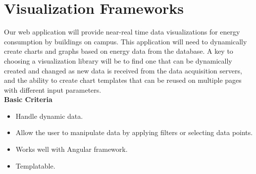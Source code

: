 \documentclass[onecolumn, draftclsnofoot,10pt, compsoc]{IEEEtran}
\begin{document}
\section{Visualization Frameworks}
Our web application will provide near-real time data visualizations for energy consumption by buildings on campus. This application will need to dynamically create charts and graphs based on energy data from the database. A key to choosing a visualization library will be to find one that can be dynamically created and changed as new data is received from the data acquisition servers, and the ability to create chart templates that can be reused on multiple pages with different input parameters.\\
\textbf{Basic Criteria}
\begin{itemize}
\item Handle dynamic data. 
\item Allow the user to manipulate data by applying filters or selecting data points. 
\item Works well with Angular framework.
\item Templatable.
\end{itemize}
\end{document}
